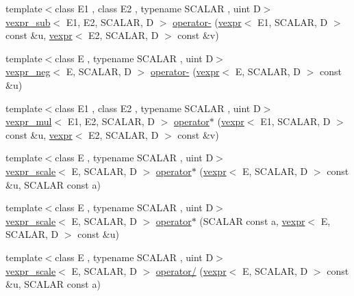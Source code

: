 \begin{DoxyCompactItemize}
\item 
{\footnotesize template$<$class E1 , class E2 , typename S\+C\+A\+L\+AR , uint D$>$ }\\\hyperlink{structmui_1_1vexpr__sub}{vexpr\+\_\+sub}$<$ E1, E2, S\+C\+A\+L\+AR, D $>$ \hyperlink{namespacemui_a6abe0b4248d7b1594551ff4f6ddda20a}{operator-\/} (\hyperlink{structmui_1_1vexpr}{vexpr}$<$ E1, S\+C\+A\+L\+AR, D $>$ const \&u, \hyperlink{structmui_1_1vexpr}{vexpr}$<$ E2, S\+C\+A\+L\+AR, D $>$ const \&v)
\item 
{\footnotesize template$<$class E , typename S\+C\+A\+L\+AR , uint D$>$ }\\\hyperlink{structmui_1_1vexpr__neg}{vexpr\+\_\+neg}$<$ E, S\+C\+A\+L\+AR, D $>$ \hyperlink{namespacemui_a37ea9d91dd5e6eaec1c603eda22140b8}{operator-\/} (\hyperlink{structmui_1_1vexpr}{vexpr}$<$ E, S\+C\+A\+L\+AR, D $>$ const \&u)
\item 
{\footnotesize template$<$class E1 , class E2 , typename S\+C\+A\+L\+AR , uint D$>$ }\\\hyperlink{structmui_1_1vexpr__mul}{vexpr\+\_\+mul}$<$ E1, E2, S\+C\+A\+L\+AR, D $>$ \hyperlink{namespacemui_ab78e75f496c4d793c673081f344d5fc6}{operator$\ast$} (\hyperlink{structmui_1_1vexpr}{vexpr}$<$ E1, S\+C\+A\+L\+AR, D $>$ const \&u, \hyperlink{structmui_1_1vexpr}{vexpr}$<$ E2, S\+C\+A\+L\+AR, D $>$ const \&v)
\item 
{\footnotesize template$<$class E , typename S\+C\+A\+L\+AR , uint D$>$ }\\\hyperlink{structmui_1_1vexpr__scale}{vexpr\+\_\+scale}$<$ E, S\+C\+A\+L\+AR, D $>$ \hyperlink{namespacemui_a4eee4d2e37367c87787dafdcb8ba81bf}{operator$\ast$} (\hyperlink{structmui_1_1vexpr}{vexpr}$<$ E, S\+C\+A\+L\+AR, D $>$ const \&u, S\+C\+A\+L\+AR const a)
\item 
{\footnotesize template$<$class E , typename S\+C\+A\+L\+AR , uint D$>$ }\\\hyperlink{structmui_1_1vexpr__scale}{vexpr\+\_\+scale}$<$ E, S\+C\+A\+L\+AR, D $>$ \hyperlink{namespacemui_aeac1932edc8db70bcba418c8acea214a}{operator$\ast$} (S\+C\+A\+L\+AR const a, \hyperlink{structmui_1_1vexpr}{vexpr}$<$ E, S\+C\+A\+L\+AR, D $>$ const \&u)
\item 
{\footnotesize template$<$class E , typename S\+C\+A\+L\+AR , uint D$>$ }\\\hyperlink{structmui_1_1vexpr__scale}{vexpr\+\_\+scale}$<$ E, S\+C\+A\+L\+AR, D $>$ \hyperlink{namespacemui_a78bf6cde292411c2533a76e7b219bf17}{operator/} (\hyperlink{structmui_1_1vexpr}{vexpr}$<$ E, S\+C\+A\+L\+AR, D $>$ const \&u, S\+C\+A\+L\+AR const a)

\end{DoxyCompactItemize}
